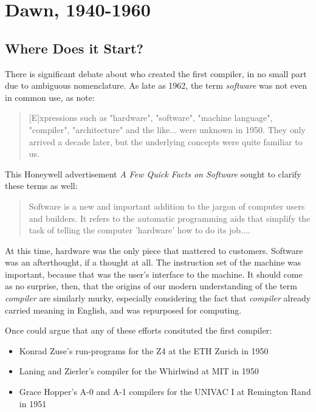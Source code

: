 \chapter{Dawn, 1940-1960}

\section{Where Does it Start?}

There is significant debate about who created the first compiler,
in no small part due to ambiguous nomenclature.
As late as 1962, the term \textit{software} was not even in common use,
as \citeauthor{the-first-computers-2002} note:

\begin{quotation}
[E]xpressions such as "hardware", "software", "machine language", "compiler",
"architecture" and the like... were unknown in 1950. They only arrived a decade
later, but the underlying concepts were quite familiar to us.
\cite{the-first-computers-2002}
\end{quotation}

This Honeywell advertisement \textit{A Few Quick Facts on Software} sought to clarify these terms as well:

\begin{quotation}
Software is a new and important addition to the jargon of computer users and builders.
It refers to the automatic programming aids that simplify the task of telling the computer 'hardware' how to do its job....
\end{quotation}

At this time, hardware was the only piece that mattered to customers.
Software was an afterthought, if a thought at all.
The instruction set of the machine was important, because that was the
user's interface to the machine.
It should come as no surprise, then, that the origins of our modern understanding of the
term \textit{compiler} are similarly murky, especially considering the fact that
\textit{compiler} already carried meaning in English, and was repurposed for computing.

\bigskip

Once could argue that any of these efforts consituted the first compiler:
\begin{itemize}
    \item Konrad Zuse's run-programs for the Z4 at the ETH Zurich in 1950
    \item Laning and Zierler's compiler for the Whirlwind at MIT in 1950
    \item Grace Hopper's A-0 and A-1 compilers for the UNIVAC I at Remington Rand in 1951
\end{itemize}

